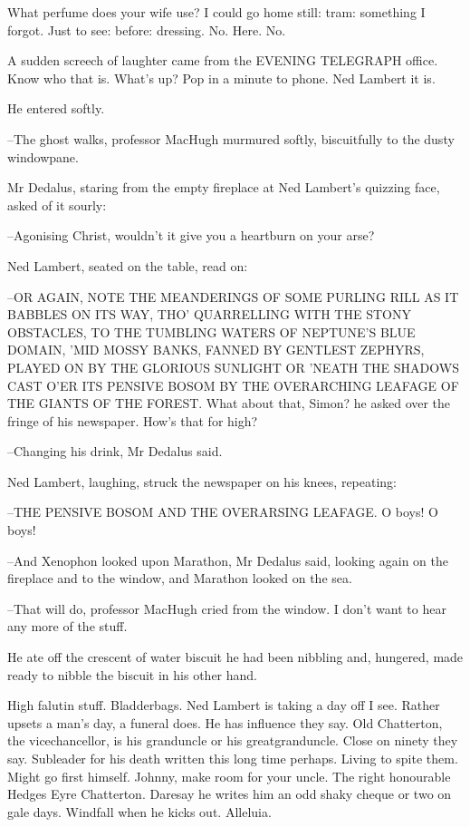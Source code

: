 What perfume does your wife use? I could go home still: tram:
something I forgot. Just to see: before: dressing. No. Here. No.

A sudden screech of laughter came from the EVENING TELEGRAPH office. Know
who that is. What's up? Pop in a minute to phone. Ned Lambert it is.

He entered softly.



--The ghost walks, professor MacHugh murmured softly, biscuitfully to
the dusty windowpane.

Mr Dedalus, staring from the empty fireplace at Ned Lambert's
quizzing face, asked of it sourly:

--Agonising Christ, wouldn't it give you a heartburn on your arse?

Ned Lambert, seated on the table, read on:

--OR AGAIN, NOTE THE MEANDERINGS OF SOME PURLING RILL AS IT BABBLES ON
ITS WAY, THO' QUARRELLING WITH THE STONY OBSTACLES, TO THE TUMBLING WATERS
OF NEPTUNE'S BLUE DOMAIN, 'MID MOSSY BANKS, FANNED BY GENTLEST ZEPHYRS,
PLAYED ON BY THE GLORIOUS SUNLIGHT OR 'NEATH THE SHADOWS CAST O'ER ITS
PENSIVE BOSOM BY THE OVERARCHING LEAFAGE OF THE GIANTS OF THE FOREST. What
about that, Simon? he asked over the fringe of his newspaper. How's that
for high?

--Changing his drink, Mr Dedalus said.

Ned Lambert, laughing, struck the newspaper on his knees, repeating:

--THE PENSIVE BOSOM AND THE OVERARSING LEAFAGE. O boys! O boys!

--And Xenophon looked upon Marathon, Mr Dedalus said, looking again
on the fireplace and to the window, and Marathon looked on the sea.

--That will do, professor MacHugh cried from the window. I don't want to
hear any more of the stuff.

He ate off the crescent of water biscuit he had been nibbling and,
hungered, made ready to nibble the biscuit in his other hand.

High falutin stuff. Bladderbags. Ned Lambert is taking a day off I
see. Rather upsets a man's day, a funeral does. He has influence they say.
Old Chatterton, the vicechancellor, is his granduncle or his
greatgranduncle. Close on ninety they say. Subleader for his death written
this long time perhaps. Living to spite them. Might go first himself.
Johnny, make room for your uncle. The right honourable Hedges Eyre
Chatterton. Daresay he writes him an odd shaky cheque or two on gale days.
Windfall when he kicks out. Alleluia.

